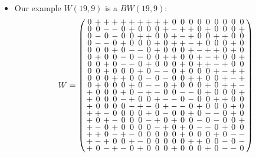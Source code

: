 \documentclass{beamer}
\begin{document}
\begin{frame}

  \begin{itemize}
  \item Our example $W(19,9)$ is a $BW(19,9)$:
    \[
      W=
      \arraycolsep=1.25pt\def\arraystretch{0.625}
      \left(
        \begin{array}{ccccccccccccccccccc}
          0&+&+&+&+&+&+&+&+&+&0&0&0&0&0&0&0&0&0\\
          0&0&-&-&0&+&0&0&0&+&-&+&+&0&+&0&0&0&+\\
          0&-&0&-&0&0&+&+&0&0&+&-&+&0&0&+&+&0&0\\
          0&-&-&0&+&0&0&0&+&0&+&+&-&+&0&0&0&+&0\\
          0&0&0&+&0&-&-&0&+&0&0&0&+&-&+&+&0&+&0\\
          0&+&0&0&-&0&-&0&0&+&+&0&0&+&-&+&0&0&+\\
          0&0&+&0&-&-&0&+&0&0&0&+&0&+&+&-&+&0&0\\
          0&0&+&0&0&0&+&0&-&-&0&+&0&0&0&+&-&+&+\\
          0&0&0&+&+&0&0&-&0&-&0&0&+&+&0&0&+&-&+\\
          0&+&0&0&0&+&0&-&-&0&+&0&0&0&+&0&+&+&-\\
          +&0&0&0&+&0&-&+&-&0&0&-&-&0&+&0&0&0&+\\
          +&0&0&0&-&+&0&0&+&-&-&0&-&0&0&+&+&0&0\\
          +&0&0&0&0&-&+&-&0&+&-&-&0&+&0&0&0&+&0\\
          +&+&-&0&0&0&0&+&0&-&0&0&+&0&-&-&0&+&0\\
          +&0&+&-&0&0&0&-&+&0&+&0&0&-&0&-&0&0&+\\
          +&-&0&+&0&0&0&0&-&+&0&+&0&-&-&0&+&0&0\\
          +&+&0&-&+&-&0&0&0&0&0&+&0&0&0&+&0&-&-\\
          +&-&+&0&0&+&-&0&0&0&0&0&+&+&0&0&-&0&-\\
          +&0&-&+&-&0&+&0&0&0&+&0&0&0&+&0&-&-&0\\
        \end{array}
      \right)
    \]
  \end{itemize}

\end{frame}

\end{document}
